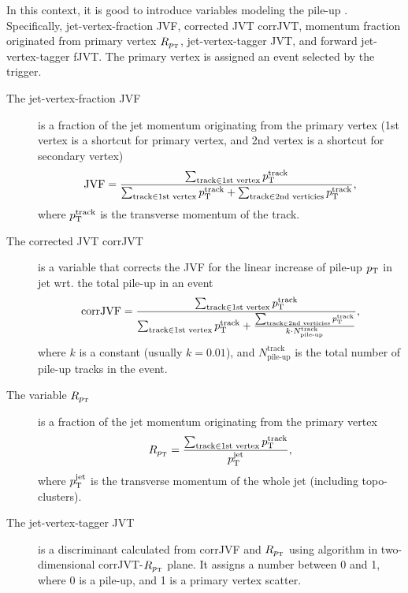 In this context, it is good to introduce variables modeling the pile-up \cite{jvt}.
Specifically, jet-vertex-fraction JVF, corrected JVT corrJVT, momentum fraction originated from primary vertex $R_{p_\text{T}}$, jet-vertex-tagger JVT, and forward jet-vertex-tagger fJVT.
The primary vertex is assigned an event selected by the trigger.  
\begin{description}
     
    \item[The jet-vertex-fraction JVF] is a fraction of the jet momentum originating from the primary vertex (1st vertex is a shortcut for primary vertex, and 2nd vertex is a shortcut for secondary vertex)
    \begin{equation}
        \label{eq:jvf}
    \text{JVF} = \frac{\sum_{\text{track} \in \text{1st vertex}} p_\text{T}^{\text{track}}}{\sum_{\text{track} \in \text{1st vertex}} p_\text{T}^{\text{track}} + \sum_{\text{track} \in \text{2nd verticies}} p_\text{T}^{\text{track}}},
    \end{equation}
    where $p_\text{T}^{\text{track}}$ is the transverse momentum of the track. 
    
    \item[The corrected JVT corrJVT] is a variable that corrects the JVF for the linear increase of pile-up $p_\text{T}$ in jet wrt. the total pile-up in an event
    \begin{equation}
        \label{eq:corr_jvf}
        \text{corrJVF} = \frac{\sum_{\text{track} \in \text{1st vertex}} p_\text{T}^{\text{track}}}{\sum_{\text{track} \in \text{1st vertex}} p_\text{T}^{\text{track}} + \frac{\sum_{\text{track} \in \text{2nd verticies}} p_\text{T}^{\text{track}}}{k\cdot N^{\text{track}}_{\text{pile-up}}}},
    \end{equation}
    where $k$ is a constant (usually $k=0.01$), and $N^{\text{track}}_{\text{pile-up}}$ is the total number of pile-up tracks in the event.
    
    
    \item[The variable $R_{p_\text{T}}$] is a fraction of the jet momentum originating from the primary vertex
    \begin{equation}
        \label{eq:rpt}
        R_{p_\text{T}} = \frac{\sum_{\text{track} \in \text{1st vertex}} p_\text{T}^{\text{track}}}{p_\text{T}^{\text{jet}}},
    \end{equation}
    where $p_\text{T}^{\text{jet}}$ is the transverse momentum of the whole jet (including topo-clusters).

    \item[The jet-vertex-tagger JVT] is a discriminant calculated from corrJVF and $R_{p_\text{T}}$ using \kNN algorithm in two-dimensional corrJVT-$R_{p_\text{T}}$ plane. 
    It assigns a number between 0 and 1, where 0 is a pile-up, and 1 is a primary vertex scatter.


\end{description}

